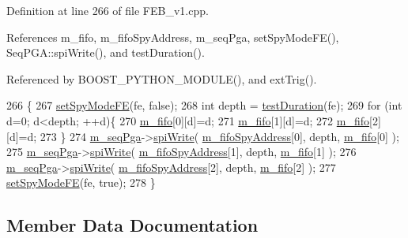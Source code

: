Definition at line 266 of file F\+E\+B\+\_\+v1.\+cpp.



References m\+\_\+fifo, m\+\_\+fifo\+Spy\+Address, m\+\_\+seq\+Pga, set\+Spy\+Mode\+F\+E(), Seq\+P\+G\+A\+::spi\+Write(), and test\+Duration().



Referenced by B\+O\+O\+S\+T\+\_\+\+P\+Y\+T\+H\+O\+N\+\_\+\+M\+O\+D\+U\+L\+E(), and ext\+Trig().


\begin{DoxyCode}
266                                   \{
267   \hyperlink{classFEB__v1_ab88d23abb96f746298e0fa1e1cf63e3e}{setSpyModeFE}(fe, \textcolor{keyword}{false});
268   \textcolor{keywordtype}{int} depth = \hyperlink{classFEB__v1_a7f1db8ca9490172fce7603da9e703dec}{testDuration}(fe);
269   \textcolor{keywordflow}{for} (\textcolor{keywordtype}{int} d=0; d<depth; ++d)\{
270     \hyperlink{classFEB__v1_ae5b770f2f5ffb97324862c93e3153985}{m\_fifo}[0][d]=d;
271     \hyperlink{classFEB__v1_ae5b770f2f5ffb97324862c93e3153985}{m\_fifo}[1][d]=d;
272     \hyperlink{classFEB__v1_ae5b770f2f5ffb97324862c93e3153985}{m\_fifo}[2][d]=d; 
273   \}
274   \hyperlink{classFEB__v1_a6c7804ac86796f233a8393043adf2e77}{m\_seqPga}->\hyperlink{classSeqPGA_ad4421841ce4ce8b88ad13f63216f0743}{spiWrite}( \hyperlink{classFEB__v1_a15b48648ba4534e732376b68bddc5d34}{m\_fifoSpyAddress}[0], depth, 
      \hyperlink{classFEB__v1_ae5b770f2f5ffb97324862c93e3153985}{m\_fifo}[0] );
275   \hyperlink{classFEB__v1_a6c7804ac86796f233a8393043adf2e77}{m\_seqPga}->\hyperlink{classSeqPGA_ad4421841ce4ce8b88ad13f63216f0743}{spiWrite}( \hyperlink{classFEB__v1_a15b48648ba4534e732376b68bddc5d34}{m\_fifoSpyAddress}[1], depth, 
      \hyperlink{classFEB__v1_ae5b770f2f5ffb97324862c93e3153985}{m\_fifo}[1] );
276   \hyperlink{classFEB__v1_a6c7804ac86796f233a8393043adf2e77}{m\_seqPga}->\hyperlink{classSeqPGA_ad4421841ce4ce8b88ad13f63216f0743}{spiWrite}( \hyperlink{classFEB__v1_a15b48648ba4534e732376b68bddc5d34}{m\_fifoSpyAddress}[2], depth, 
      \hyperlink{classFEB__v1_ae5b770f2f5ffb97324862c93e3153985}{m\_fifo}[2] );
277   \hyperlink{classFEB__v1_ab88d23abb96f746298e0fa1e1cf63e3e}{setSpyModeFE}(fe, \textcolor{keyword}{true});
278 \}
\end{DoxyCode}


\subsection{Member Data Documentation}
\mbox{\label{classAttrib_a3414521d7a82476e874b25a5407b5e63}} 
